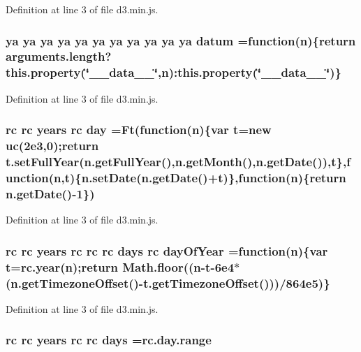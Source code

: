 Definition at line 3 of file d3.\+min.\+js.

\subsubsection[{datum}]{ {\bf ya} {\bf ya} {\bf ya} {\bf ya} {\bf ya} {\bf ya} {\bf ya} {\bf ya} {\bf ya} {\bf ya} {\bf ya} datum =function({\bf n})\{{\bf return} arguments.\+length?{\bf this.\+property}(\char`\"{}\+\_\+\+\_\+data\+\_\+\+\_\+\char`\"{},n)\+:{\bf this.\+property}(\char`\"{}\+\_\+\+\_\+data\+\_\+\+\_\+\char`\"{})\}}\label{d3_8min_8js_a8455ccb5d1c7c39e1210563db25de0b1}


Definition at line 3 of file d3.\+min.\+js.

\subsubsection[{day}]{ {\bf rc} {\bf rc} {\bf years} {\bf rc} day =Ft(function({\bf n})\{var t=new {\bf uc}(2e3,0);return t.\+set\+Full\+Year(n.\+get\+Full\+Year(),n.\+get\+Month(),n.\+get\+Date()),t\},function(n,t)\{n.\+set\+Date(n.\+get\+Date()+t)\},function(n)\{return n.\+get\+Date()-\/1\})}\label{d3_8min_8js_a4b21052232f62121c2bf43f51fb08577}


Definition at line 3 of file d3.\+min.\+js.

\subsubsection[{day\+Of\+Year}]{ {\bf rc} {\bf rc} {\bf years} {\bf rc} {\bf rc} {\bf rc} {\bf days} {\bf rc} day\+Of\+Year =function({\bf n})\{var t={\bf rc.\+year}({\bf n});{\bf return} Math.\+floor(({\bf n}-\/t-\/6e4$\ast$(n.\+get\+Timezone\+Offset()-\/t.\+get\+Timezone\+Offset()))/864e5)\}}\label{d3_8min_8js_aa19930c6fcd4bccf2649c6bdf4066051}


Definition at line 3 of file d3.\+min.\+js.

\subsubsection[{days}]{ {\bf rc} {\bf rc} {\bf years} {\bf rc} {\bf rc} days ={\bf rc.\+day.\+range}}\label{d3_8min_8js_ac14d486e16f3f1e52c69f1b19a81ef51}



